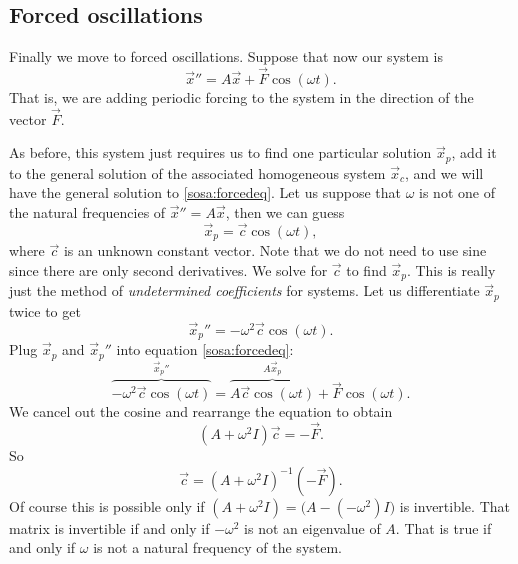 \subsection{Forced oscillations}

Finally we move to forced oscillations.
Suppose that now our system is
\begin{equation} \label{sosa:forcedeq}
{\vec{x}}'' = A \vec{x} + \vec{F} \cos ( \omega t) .
\end{equation}
That is, we are adding periodic forcing to the system in the direction of
the vector $\vec{F}$.

As before, this system just requires us to find one particular solution
$\vec{x}_p$, add it to the general solution of the associated homogeneous system
$\vec{x}_c$, and we will have the general solution to \eqref{sosa:forcedeq}.
Let us suppose that $\omega$ is not one of the natural frequencies of
${\vec{x}}'' = A \vec{x}$, then we can guess
\begin{equation*}
\vec{x}_p = \vec{c} \cos (\omega t) ,
\end{equation*}
where $\vec{c}$ is an unknown constant vector.  Note that we do not need
to use sine since there are only second derivatives.  We solve for $\vec{c}$ to
find $\vec{x}_p$.  This is really just the method of
\emph{undetermined coefficients}
for systems.  Let us differentiate $\vec{x}_p$ twice to get
\begin{equation*}
{\vec{x}_p}'' = -\omega^2 \vec{c} \cos (\omega t) .
\end{equation*}
Plug $\vec{x}_p$ and ${\vec{x}_p}''$ into equation \eqref{sosa:forcedeq}:
\begin{equation*}
\overbrace{
-\omega^2 \vec{c} \cos (\omega t)
}^{{\vec{x}_p}''}
=
\overbrace{
A \vec{c} \cos (\omega t) 
}^{A \vec{x}_p}
+ \vec{F} \cos (\omega t) .
\end{equation*}
We cancel out the cosine and rearrange the equation to obtain
\begin{equation*}
(A +\omega^2 I) \vec{c}
=
- \vec{F} .
\end{equation*}
So
\begin{equation*}
\vec{c}
=
{(A +\omega^2 I)}^{-1}
(-\vec{F} ).
\end{equation*}
Of course this is possible only if
$(A+ \omega^2 I) = \bigl(A- (-\omega^2) I\bigr)$ is
invertible.  That matrix is invertible if and only if
$-\omega^2$ is not an eigenvalue of $A$.  That is true if and only if $\omega$
is not a natural frequency of the system.

